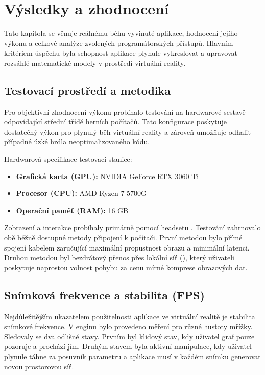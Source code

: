 \documentclass[czech, kiv, sem, he, iso690alph, pdf,viewonly]{fasthesis}
\begin{document}
\chapter{Výsledky a zhodnocení}
Tato kapitola se věnuje reálnému běhu vyvinuté aplikace, hodnocení jejího výkonu a celkové analýze zvolených programátorských přístupů. 
Hlavním kritériem úspěchu byla schopnost aplikace plynule vykreslovat a upravovat rozsáhlé matematické modely v prostředí virtuální reality.

\section{Testovací prostředí a metodika}
Pro objektivní zhodnocení výkonu probíhalo testování na hardwarové sestavě odpovídající střední třídě herních počítačů. 
Tato konfigurace poskytuje dostatečný výkon pro plynulý běh virtuální reality a zároveň umožňuje odhalit případné úzké hrdla neoptimalizovaného kódu.

Hardwarová specifikace testovací stanice:
\begin{itemize}
    \item \textbf{Grafická karta (GPU):} NVIDIA GeForce RTX 3060 Ti
    \item \textbf{Procesor (CPU):} AMD Ryzen 7 5700G
    \item \textbf{Operační paměť (RAM):} 16 GB
\end{itemize}

Zobrazení a interakce probíhaly primárně pomocí headsetu . 
Testování zahrnovalo obě běžně dostupné metody připojení k počítači. 
První metodou bylo přímé spojení kabelem zaručující maximální propustnost obrazu a minimální latenci. 
Druhou metodou byl bezdrátový přenos přes lokální síť (), který uživateli poskytuje naprostou volnost pohybu za cenu mírné komprese obrazových dat.

\section{Snímková frekvence a stabilita (FPS)}
Nejdůležitějším ukazatelem použitelnosti aplikace ve virtuální realitě je stabilita snímkové frekvence. V enginu  bylo provedeno měření pro různé hustoty mřížky. 
Sledovaly se dva odlišné stavy. 
Prvním byl klidový stav, kdy uživatel graf pouze pozoruje a prochází jím. 
Druhým stavem byla aktivní manipulace, kdy uživatel plynule táhne za posuvník parametru a aplikace musí v každém snímku generovat novou prostorovou síť.
\end{document}
